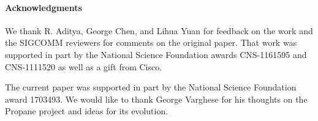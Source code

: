 \documentclass[10pt]{sigalternate052015}
\newcommand{\para}[1]{\paragraph*{\textbf{#1}}}
\begin{document}
\para{Acknowledgments}
We thank R. Aditya, George Chen, and Lihua Yuan for feedback on the
work and the SIGCOMM reviewers for comments on the original
paper. That work was supported in part by the National Science
Foundation awards CNS-1161595 and CNS-1111520 as well as a gift from
Cisco.

The current paper was supported in part by the National Science
Foundation award 1703493.  We would like to thank George Varghese for
his thoughts on the Propane project and ideas for its evolution.


\balance




\end{document}
